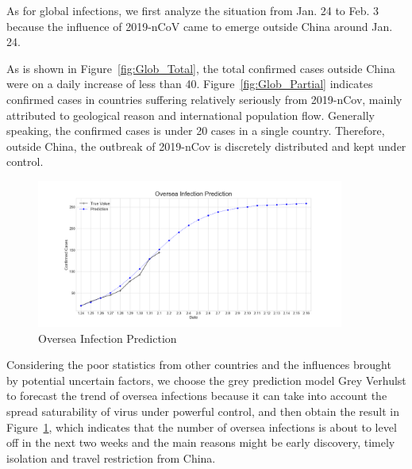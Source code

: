 \documentclass[12pt]{mcmthesis}
\begin{document}
As for global infections, we first analyze the situation from Jan. 24 to Feb. 3 because the influence of 2019-nCoV came to emerge outside China around Jan. 24.

As is shown in Figure~\ref{fig:Glob_Total}, the total confirmed cases outside China were on a daily increase of less than 40. Figure~\ref{fig:Glob_Partial} indicates confirmed cases in countries suffering relatively seriously from 2019-nCov, mainly attributed to geological reason and  international population flow. Generally speaking, the confirmed cases is under 20 cases in a single country. Therefore, outside China, the outbreak of 2019-nCov is discretely distributed and kept under control.

\begin{figure}[H]
    \centering
    \includegraphics[width=0.9\textwidth]{figure/Oversea_Prediction.png}
    \caption{Oversea Infection Prediction}
    \label{fig:oversea}
\end{figure}

Considering the poor statistics from other countries and the influences brought by potential uncertain factors, we choose the grey prediction model Grey Verhulst to forecast the trend of oversea infections because it can take into account the spread saturability of virus under powerful control, and then obtain the result in Figure~\ref{fig:oversea}, which indicates that the number of oversea infections is about to level off in the next two weeks and the main reasons might be early discovery, timely isolation and travel restriction from China.
\end{document}
